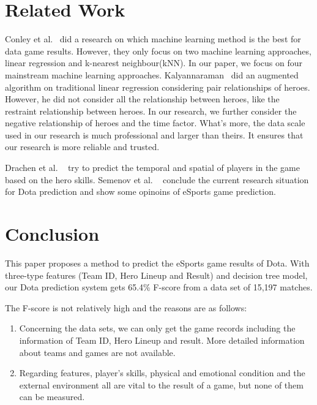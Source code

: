 \documentclass{article}
\begin{document}
\section{Related Work}
Conley et al.~\cite{conley2013does} did a research on which machine learning method is the best for data game results.
However, they only focus on two machine learning approaches, linear regression and k-nearest neighbour(kNN).
In our paper, we focus on four mainstream machine learning approaches.
Kalyannaraman~\cite{kau2013win} did an augmented algorithm on traditional linear regression considering pair relationships of heroes.
However, he did not consider all the relationship between heroes, like the restraint relationship between heroes.
In our research, we further consider the negative relationship of heroes and the time factor.
What's more, the data scale used in our research is much professional and larger than theirs.
It ensures that our research is more reliable and trusted.

Drachen et al. ~\cite{drachen2014skill} try to predict the temporal and spatial of players in the game based on the hero skills.
Semenov et al. ~\cite{semenovapplications} conclude the current research situation for Dota prediction
and show some opinoins of eSports game prediction.

\section{Conclusion}

This paper proposes a method to predict the eSports game results of Dota.
With three-type features (Team ID, Hero Lineup and Result) and decision tree model, our Dota prediction system gets 65.4\% F-score from a data set of 15,197 matches.
 
The F-score is not relatively high and the reasons are as follows:
\begin{enumerate}
\item Concerning the data sets, we can only get the game records including the information of Team ID, Hero Lineup and result.
More detailed information about teams and games are not available.

\item Regarding features, player’s skills, physical and emotional condition and the external environment all are vital to the result of a game, but none of them can be measured.

\end{enumerate}

\vfill\pagebreak



\end{document}

